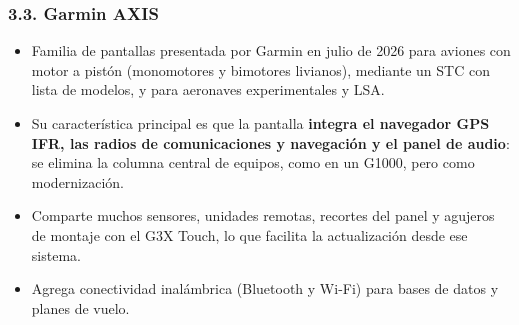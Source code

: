 \subsubsection*{3.3. Garmin AXIS}
\begin{itemize}
  \item Familia de pantallas presentada por Garmin en julio de 2026 para aviones con motor a pistón
        (monomotores y bimotores livianos), mediante un STC con lista de modelos, y para aeronaves
        experimentales y LSA.
  \item Su característica principal es que la pantalla \textbf{integra el navegador GPS IFR, las
        radios de comunicaciones y navegación y el panel de audio}: se elimina la columna central de
        equipos, como en un G1000, pero como modernización.
  \item Comparte muchos sensores, unidades remotas, recortes del panel y agujeros de montaje con el
        G3X Touch, lo que facilita la actualización desde ese sistema.
  \item Agrega conectividad inalámbrica (Bluetooth y Wi-Fi) para bases de datos y planes de vuelo.
\end{itemize}

